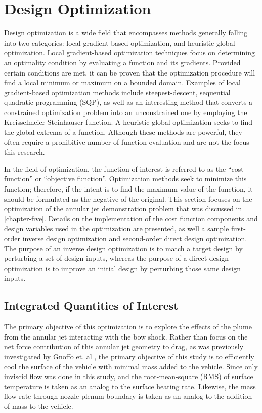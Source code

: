 \chapter{Design Optimization}
\label{chapter-six}

Design optimization is a wide field that encompasses methods generally falling
into two categories: local gradient-based optimization, and heuristic global
optimization.  Local gradient-based optimization techniques focus on determining
an optimality condition by evaluating a function and its gradients.  Provided
certain conditions are met, it can be proven that the optimization procedure
will find a local minimum or maximum on a bounded domain.  Examples of local
gradient-based optimization methods include
steepest-descent\cite{fletcher1963rapidly}, sequential quadratic programming
(SQP)\cite{SNOPT-alg}, as well as an interesting method that converts a
constrained optimization problem into an unconstrained one by employing the
Kreisselmeier-Steinhauser function\cite{wrenn1989indirect}.  A heuristic global
optimization seeks to find the global extrema of a function.  Although these
methods are powerful, they often require a prohibitive number of function
evaluation and are not the focus this research.

In the field of optimization, the function of interest is referred to as the
``cost function'' or ``objective function''.  Optimization methods seek to
minimize this function; therefore, if the intent is to find the maximum value
of the function, it should be formulated as the negative of the original.  This
section focuses on the optimization of the annular jet demonstration problem
that was discussed in \cref{chapter-five}.  Details on the implementation of the
cost function components and design variables used in the optimization are
presented, as well a sample first-order inverse design optimization and
second-order direct design optimization.  The purpose of an inverse design
optimization is to match a target design by perturbing a set of design inputs,
whereas the purpose of a direct design optimization is to improve an initial
design by perturbing those same design inputs.

\section{Integrated Quantities of Interest}

The primary objective of this optimization is to explore the effects of the plume
from the annular jet interacting with the bow shock.  Rather than focus on the
net force contribution of this annular jet geometry to drag, as was previously
investigated by Gnoffo et. al \cite{gnoffo2016tapping}, the primary objective of
this study is to efficiently cool the surface of the vehicle with minimal mass
added to the vehicle.  Since only inviscid flow was done in this study, and the
root-mean-square (RMS) of surface temperature is taken as an analog to the
surface heating rate.  Likewise, the mass flow rate through nozzle plenum
boundary is taken as an analog to the addition of mass to the vehicle.

